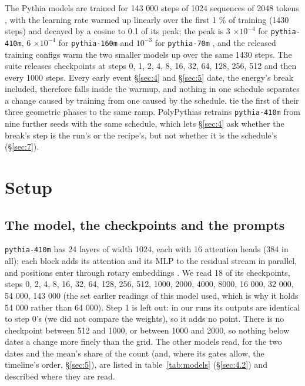 \documentclass[11pt]{article}
\begin{document}
The Pythia models are trained for 143 000 steps of 1024 sequences of 2048 tokens \citep{biderman2023}, with the learning rate warmed up linearly over the first 1 \% of training (1430 steps) and decayed by a cosine to 0.1 of its peak; the peak is 3 $\times 10^{-4}$ for \texttt{pythia-410m}, 6 $\times 10^{-4}$ for \texttt{pythia-160m} and $10^{-3}$ for \texttt{pythia-70m} \citep{biderman2023}, and the released training configs warm the two smaller models up over the same 1430 steps. The suite releases checkpoints at steps 0, 1, 2, 4, 8, 16, 32, 64, 128, 256, 512 and then every 1000 steps. Every early event \S\ref{sec:4} and \S\ref{sec:5} date, the energy's break included, therefore falls inside the warmup, and nothing in one schedule separates a change caused by training from one caused by the schedule. \citet{li2025} tie the first of their three geometric phases to the same ramp. PolyPythias \citep{vanderwal2025} retrains \texttt{pythia-410m} from nine further seeds with the same schedule, which lets \S\ref{sec:4} ask whether the break's step is the run's or the recipe's, but not whether it is the schedule's (\S\ref{sec:7}).

\section{Setup}\label{sec:3}

\subsection{The model, the checkpoints and the prompts}\label{sec:3.1}

\texttt{pythia-410m} has 24 layers of width 1024, each with 16 attention heads (384 in all); each block adds its attention and its MLP to the residual stream in parallel, and positions enter through rotary embeddings \citep{biderman2023}. We read 18 of its checkpoints, steps 0, 2, 4, 8, 16, 32, 64, 128, 256, 512, 1000, 2000, 4000, 8000, 16 000, 32 000, 54 000, 143 000 (the set earlier readings of this model used, which is why it holds 54 000 rather than 64 000). Step 1 is left out: in our runs its outputs are identical to step 0's (we did not compare the weights), so it adds no point. There is no checkpoint between 512 and 1000, or between 1000 and 2000, so nothing below dates a change more finely than the grid. The other models read, for the two dates and the mean's share of the count (and, where its gates allow, the timeline's order, \S\ref{sec:5}), are listed in table~\ref{tab:models} (\S\ref{sec:4.2}) and described where they are read.
\end{document}
